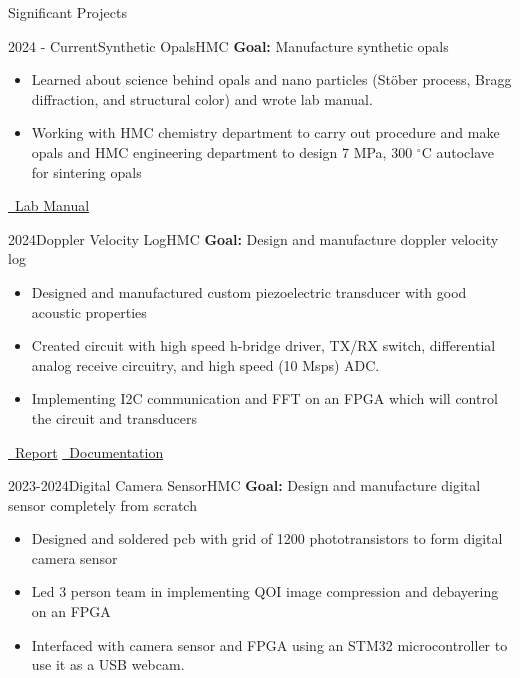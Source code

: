 \documentclass[]{mcdowellcv}
\begin{document}
\begin{cvsection}{Significant Projects}
	\begin{cvsubsection}{2024 - Current}{Synthetic Opals}{HMC}
		\textbf{Goal:} Manufacture synthetic opals
		\begin{itemize}
			\item Learned about science behind opals and nano particles (St\"ober process, Bragg diffraction, and structural color) and wrote lab manual.
			\item Working with HMC chemistry department to carry out procedure and make opals and HMC engineering department to design 7 MPa, 300 $^\circ$C autoclave for sintering opals
		\end{itemize}
		\href{https://kavidey.notion.site/SNPs-Synthetic-Opals-Lab-Manual-648f35746e4c405987239699e7e6bfce?pvs=4/}{\faBook \ Lab Manual}
	\end{cvsubsection}
	\begin{cvsubsection}{2024}{Doppler Velocity Log}{HMC}
		\textbf{Goal:} Design and manufacture doppler velocity log
		\begin{itemize}
			\item Designed and manufactured custom piezoelectric transducer with good acoustic properties
			\item Created circuit with high speed h-bridge driver, TX/RX switch, differential analog receive circuitry, and high speed (10 Msps) ADC.
			\item Implementing I2C communication and FFT on an FPGA which will control the circuit and transducers
		\end{itemize}
		\href{https://kavidey.com/assets/projects/dvl/e80_report.pdf}{\faBook \ Report}
		\href{https://docs.google.com/document/d/18yRygu0o4ie6aZtUGPSXawOBYlJCxya42LHkkw6iH5E/edit}{\faBook \ Documentation}
	\end{cvsubsection}
	\begin{cvsubsection}{2023-2024}{Digital Camera Sensor}{HMC}
		\textbf{Goal:} Design and manufacture digital sensor completely from scratch
		\begin{itemize}
			\item Designed and soldered pcb with grid of 1200 phototransistors to form digital camera sensor
			\item Led 3 person team in implementing QOI image compression and debayering on an FPGA
			\item Interfaced with camera sensor and FPGA using an STM32 microcontroller to use it as a USB webcam.
		\end{itemize}

\end{cvsubsection}
\end{cvsection}
\end{document}
